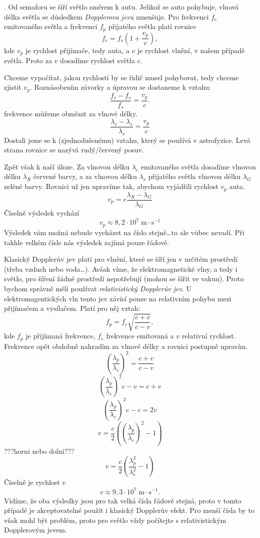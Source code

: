 \documentclass{../../../../style/mkimain}
\begin{document}
\noindent{}
.
\klein
Od semaforu se šíří světlo směrem k autu. Jelikož se auto pohybuje, vlnová délka světla se důsledkem \emph{Dopplerova jevu} zmenšuje.
Pro frekvenci $f_e$ emitovaného světla a frekvenci $f_p$ přijatého světla platí rovnice
$$f_e=f_s\left(1+\frac{v_p}{v}\right),$$
kde $v_p$ je rychlost přijímače, tedy auta, a $v$ je rychlost vlnění, v našem případě světla.
Proto za $v$ dosadíme rychlost světla $c$.

Chceme vypočítat, jakou rychlostí by se řidič musel pohybovat, tedy chceme zjistit $v_p$.
Roznásobením závorky a úpravou se dostaneme k vztahu:
$$\frac{f_e-f_s}{f_s}=\frac{v_p}{c}.$$
frekvence můžeme obměnit za vlnové délky. 
$$\frac{\lambda_e-\lambda_s}{\lambda_s}=\frac{v_p}{c}$$
Dostali jsme se k (zjednodušenému) vztahu, který se používá v astrofyzice. Levá strana rovnice se nazývá rudý/červený posuv. 

Zpět však k naší úloze.
Za vlnovou délku $\lambda_e$ emitovaného světla dosadíme vlnovou délku $\lambda_R$ červené barvy, a za vlnovou délku $\lambda_s$ přijatého světla vlnovou délku $\lambda_G$ zeléné barvy. 
Rovnici už jen upravíme tak, abychom vyjádřili rychlost $v_p$ auta.
$${v_p}=c\frac{\lambda_R-\lambda_G}{\lambda_G}$$
Číselně výsledek vychází
$$v_p\approx8,2\cdot10^7\;\mathrm{m\cdot s^{-1}}$$
Výsledek vám možná nebude vycházet na číslo stejně\dots to ale vůbec nevadí. Při takhle velkém čísle nás výsledek zajímá pouze řádově.  

Klasický Dopplerův jev platí pro vlnění, které se šíří jen v určitém prostředí (třeba vzduch nebo voda\dots).
Avšak víme, že elektromagnetické vlny, a tedy i světlo, pro šíření žádné prostředí nepotřebují (mohou se šířit ve vakuu).
Proto bychom správně měli používat \textit{relativistický Dopplerův jev}.
U elektromagentických vln tento jev závisí pouze na relativním pohybu mezi přijímačem a vysílačem.
\newpage
\noindent
Platí pro něj vztah:
$$f_p=f_e\sqrt{\frac{c+v}{c-v}},$$
kde $f_p$ je přijímaná frekvence, $f_e$ frekvence emitovaná a $v$ relativní rychlost.
Frekvence opět obdobně nahradím za vlnové délky a rovnici postupně upravím.
$$\left(\frac{\lambda_p}{\lambda_e}\right)^2=\frac{c+v}{c-v}$$
$$\left(\frac{\lambda_p}{\lambda_e}\right)^2{c-v}={c+v}$$
$$\left(\frac{\lambda_p}{\lambda_e}\right)^2c-c=2v$$
$$v=\frac{c}{2}\left(\left(\frac{\lambda_p}{\lambda_e}\right)^2-1\right)$$
???horni nebo dolni???
$$v=\frac{c}{2}\left(\frac{\lambda_p^2}{\lambda_e^2}-1\right)$$
Číselně je rychlost $v$
$$v\approx9,3\cdot10^7\;\mathrm{m\cdot s^{-1}}.$$
Vidíme, že oba výsledky jsou pro tak velká čísla řádově stejná, proto v tomto případě je akceptovatelné použít i klasický Dopplerův efekt.
Pro menší čísla by to však mohl být problém, proto pro světlo vždy počítejte s relativistickým Dopplerovým jevem.
\end{document}
